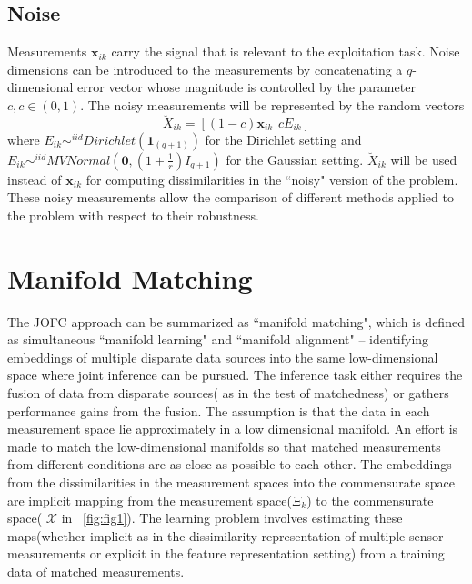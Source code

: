 \documentclass[11pt]{article} %
\begin{document}
\subsection{Noise\label{noise}}
Measurements $\bm{x}_{ik}$ carry the signal that is relevant to the exploitation task.  Noise dimensions can be introduced to  the measurements by concatenating a $q$-dimensional error vector whose magnitude is controlled by the parameter $c, c\in (0,1)$. The noisy measurements will be  represented by the random vectors 
 \begin{equation}
\breve{X}_{ik}=[(1-c)\bm{x}_{ik}\hspace{5pt} cE_{ik}]\label{eq:noise-expr}
\end{equation}
 where $E_{ik} \sim^{iid} Dirichlet(\bm{1}_{(q+1)})\label{eq:noise-model-dir} $ for the Dirichlet setting and $E_{ik} \sim^{iid} MVNormal(\bm{0} , (1+\frac{1}{r})I_{q+1}) \label{eq:noise-model-mvn} $ for the Gaussian setting. $\breve{X}_{ik}$ will be used instead of $\bm{x}_{ik}$ for computing dissimilarities in the ``noisy" version of the problem. These noisy measurements allow the comparison of  different methods applied to the problem with respect to their robustness.
  

\section{Manifold Matching\label{sec:JOFC}}
  The JOFC approach can be summarized as  ``manifold matching", which is defined as simultaneous ``manifold learning" and ``manifold alignment" -- identifying embeddings of multiple disparate data sources into the same low-dimensional space where joint inference can be pursued. The inference task either requires the fusion of data from disparate sources( as in the test of matchedness) or gathers performance gains from the fusion. The assumption is that the data in each measurement space lie approximately in a low dimensional manifold. An effort is made to match the low-dimensional manifolds so that matched measurements from different conditions are as close as possible to each other.  The embeddings from the dissimilarities in the measurement spaces into the commensurate space are implicit mapping from the measurement space($\Xi_k$)  to the commensurate space( $\mathcal{X}$ in ~\ref{fig:fig1}). The learning problem involves estimating these maps(whether implicit as in the dissimilarity representation of multiple sensor measurements or explicit in the  feature representation setting)  from a training data of matched measurements.
\end{document}
